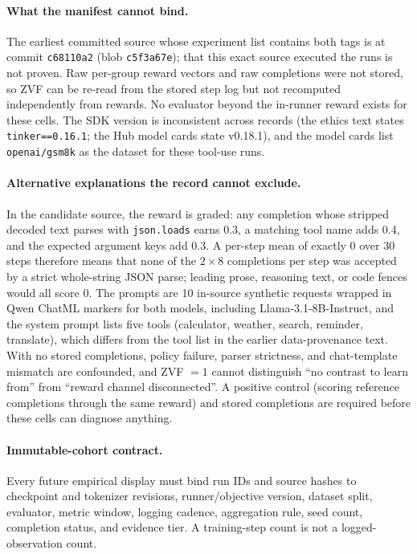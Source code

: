 \paragraph{What the manifest cannot bind.}
The earliest committed source whose experiment list contains both tags is
 at commit
\texttt{c68110a2} (blob \texttt{c5f3a67e}); that this exact source executed the
runs is not proven. Raw per-group reward vectors and raw completions were not
stored, so ZVF can be re-read from the stored step log but not recomputed
independently from rewards. No evaluator beyond the in-runner reward exists for
these cells. The SDK version is inconsistent across records (the ethics text
states \texttt{tinker==0.16.1}; the Hub model cards state v0.18.1), and the
model cards list \texttt{openai/gsm8k} as the dataset for these tool-use runs.

\paragraph{Alternative explanations the record cannot exclude.}
In the candidate source, the reward is graded: any completion whose stripped
decoded text parses with \texttt{json.loads} earns 0.3, a matching tool name
adds 0.4, and the expected argument keys add 0.3. A per-step mean of exactly 0
over 30 steps therefore means that none of the $2\times8$ completions per step
was accepted by a strict whole-string JSON parse; leading prose, reasoning
text, or code fences would all score 0. The prompts are 10 in-source synthetic
requests wrapped in Qwen ChatML markers for both models, including
Llama-3.1-8B-Instruct, and the system prompt lists five tools (calculator,
weather, search, reminder, translate), which differs from the tool list in the
earlier data-provenance text. With no stored completions, policy failure,
parser strictness, and chat-template mismatch are confounded, and ZVF $=1$
cannot distinguish ``no contrast to learn from'' from ``reward channel
disconnected''. A positive control (scoring reference completions through the
same reward) and stored completions are required before these cells can
diagnose anything.

\paragraph{Immutable-cohort contract.}
Every future empirical display must bind run IDs and source hashes to checkpoint
and tokenizer revisions, runner/objective version, dataset split, evaluator,
metric window, logging cadence, aggregation rule, seed count, completion status,
and evidence tier. A training-step count is not a logged-observation count.

